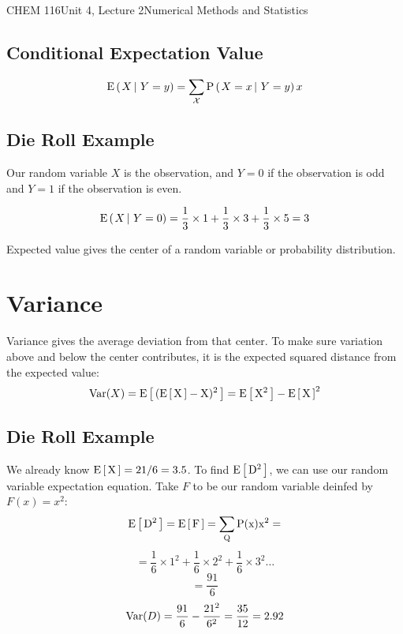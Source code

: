 \documentclass{article}
\begin{document}
\begin{tdoc}{CHEM 116}{Unit 4, Lecture 2}{Numerical Methods and Statistics}
\subsection{Conditional Expectation Value}
\begin{equation}
\operatorname{E} \left( \left.X \, \right| \,Y=y \right) = \sum_\mathcal{X} \textrm{P} \left( \left.X=x \, \right| \,Y=y \right)x
\end{equation}

\subsection{Die Roll Example}

Our random variable $X$ is the observation, and $Y = 0$ if the observation is odd and $Y = 1$ if the observation is even.

\[
\operatorname{E} \left( \left.X \, \right| \,Y=0 \right) = \frac{1}{3}\times{}1 + \frac{1}{3}\times{}3 + \frac{1}{3}\times{}5 = 3
\]

Expected value gives the center of a random variable or probability
distribution.

\section{Variance}

Variance gives the average deviation from that
center. To make sure variation above and below the center contributes,
it is the expected squared distance from the expected value:
\begin{equation}
\operatorname{Var}(X) = \rm{E}\left[\,(\rm{E}\left[\,X\,\right] - X)^2\,\right] = \rm{E}\left[\,X^2\,\right] - \rm{E}\left[\,X\,\right]^2
\end{equation}

\subsection{Die Roll Example}
We already know $\rm{E}\left[\,X\,\right] = 21/6 =  3.5$. To find $\rm{E}\left[\,D^2\,\right]$, we can use our
random variable expectation equation. Take $F$ to be our random
variable deinfed by $F(x) = x^2$:
\[
\rm{E}\left[\,D^2\,\right] = \rm{E}\left[\,F\,\right] = \sum_Q P(x)x^2 =
\]
\[
= \frac{1}{6}\times{}1^2 + \frac{1}{6}\times{}2^2 + \frac{1}{6}\times{}3^2 \ldots
\]
\[
 = \frac{91}{6}
\]
\[
\operatorname{Var}(D) = \frac{91}{6} - \frac{21^2}{6^2} = \frac{35}{12} = 2.92
\]

\end{tdoc}
\end{document}

